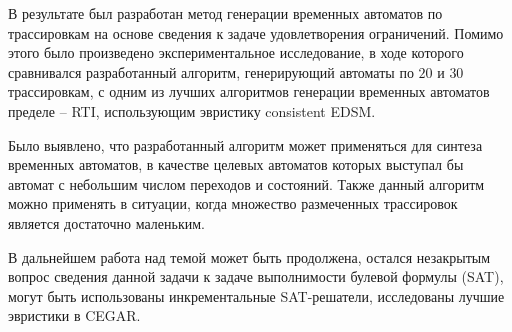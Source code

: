 \documentclass[times,specification,annotation]{itmo-student-thesis}
\begin{document}
В результате был разработан метод генерации временных автоматов по трассировкам на основе сведения к задаче удовлетворения ограничений.
Помимо этого было произведено экспериментальное исследование, в ходе которого сравнивался разработанный алгоритм, генерирующий автоматы по $20$ и $30$ трассировкам, 
с одним из лучших алгоритмов генерации временных автоматов пределе -- RTI, использующим эвристику consistent EDSM.

Было выявлено, что разработанный алгоритм может применяться для синтеза временных автоматов, в качестве целевых автоматов которых выступал бы автомат с
небольшим числом переходов и состояний. Также данный алгоритм можно применять в ситуации, когда множество размеченных трассировок является достаточно маленьким.

В дальнейшем работа над темой может быть продолжена, остался незакрытым вопрос сведения данной задачи к задаче выполнимости булевой формулы (SAT),
могут быть использованы инкрементальные SAT-решатели, исследованы лучшие эвристики в CEGAR.

\printmainbibliography

\appendix
\end{document}
